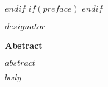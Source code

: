 \documentclass[12pt,letterpaper,toc=flat,oneside]{report}
\begin{document}
 \def\ackhead{\chapter*{Acknowledgements}
  \addcontentsline{toc}{chapter}{Acknowledgements}
  \addtocontents{toc}{\protect\addvspace{10\p@}}
 }
 \def\acktail{\par \null\vspace*{.75in}\hspace*{3in} \@author \newpage} 
$endif$
$if(preface)$
\newenvironment{preface}{
\chapter*{Preface}     
\addcontentsline{toc}{chapter}{Preface}
\addtocontents{toc}{\protect\addvspace{10\p@}}
}{}
$endif$
    \thispagestyle{plain}
    \noindent $designator$
    \begin{center}
	\large\bfseries Abstract
    \end{center}
    \vspace{2em}
    $abstract$
\renewcommand\contentsname{\centering \large Table of Contents}
\tableofcontents
\newpage
\renewcommand\listtablename{\centering \large List of Tables}
\listoftables
\newpage
\renewcommand\listfigurename{\centering \large List of Figures}
\listoffigures
\newpage
$body$
\newpage
\end{document}
